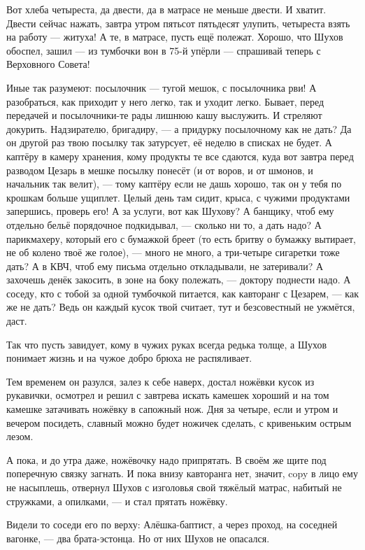 Вот хлеба четыреста, да двести, да в матрасе не меньше двести. И хватит. Двести сейчас нажать,
завтра утром пятьсот пятьдесят улупить, четыреста взять на работу --- житуха! А те, в матрасе,
пусть ещё полежат. Хорошо, что Шухов обоспел, зашил --- из тумбочки вон в 75-й упёрли ---
спрашивай теперь с Верховного Совета!

Иные так разумеют: посылочник --- тугой мешок, с посылочника рви! А разобраться, как приходит у
него легко, так и уходит легко. Бывает, перед передачей и посылочники-те рады лишнюю кашу
выслужить. И стреляют докурить. Надзирателю, бригадиру, --- а придурку посылочному как не
дать? Да он другой раз твою посылку так затурсует, её неделю в списках не будет. А каптёру в
камеру хранения, кому продукты те все сдаются, куда вот завтра перед разводом Цезарь в мешке
посылку понесёт (и от воров, и от шмонов, и начальник так велит), --- тому каптёру если не дашь
хорошо, так он у тебя по крошкам больше ущиплет. Целый день там сидит, крыса, с чужими
продуктами запершись, проверь его! А за услуги, вот как Шухову? А банщику, чтоб ему отдельно
бельё порядочное подкидывал, --- сколько ни то, а дать надо? А парикмахеру, который его с
бумажкой бреет (то есть бритву о бумажку вытирает, не об колено твоё же голое), --- много не
много, а три-четыре сигаретки тоже дать? А в КВЧ, чтоб ему письма отдельно откладывали, не
затеривали? А захочешь денёк закосить, в зоне на боку полежать, --- доктору поднести надо. А
соседу, кто с тобой за одной тумбочкой питается, как кавторанг с Цезарем, --- как же не дать?
Ведь он каждый кусок твой считает, тут и безсовестный не ужмётся, даст.

Так что пусть завидует, кому в чужих руках всегда редька толще, а Шухов понимает жизнь и на
чужое добро брюха не распяливает.

Тем временем он разулся, залез к себе наверх, достал ножёвки кусок из рукавички, осмотрел и
решил с завтрева искать камешек хороший и на том камешке затачивать ножёвку в сапожный нож.
Дня за четыре, если и утром и вечером посидеть, славный можно будет ножичек сделать, с
кривеньким острым лезом.

А пока, и до утра даже, ножёвочку надо припрятать. В своём же щите под поперечную связку
загнать. И пока внизу кавторанга нет, значит, copy в лицо ему не насыплешь, отвернул Шухов с
изголовья свой тяжёлый матрас, набитый не стружками, а опилками, --- и стал прятать ножёвку.

Видели то соседи его по верху: Алёшка-баптист, а через проход, на соседней вагонке, --- два
брата-эстонца. Но от них Шухов не опасался.

